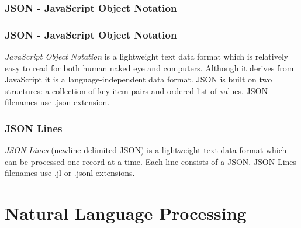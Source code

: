 \begin{frame}[fragile]
    \frametitle{JSON - JavaScript Object Notation}
    \mycode
\end{frame}

\begin{frame}
    \frametitle{JSON - JavaScript Object Notation}
    \begin{definition}
        \emph{JavaScript Object Notation} is a lightweight text data format which is relatively easy to read for both human naked eye and computers. Although it derives from JavaScript it is a language-independent data format. JSON is built on two structures: a collection of key-item pairs and ordered list of values. JSON filenames use .json extension.
    \end{definition}
\end{frame}


\begin{frame}[fragile]
    \frametitle{JSON Lines}
    \mycode
    \begin{definition}
        \emph{JSON Lines} (newline-delimited JSON) is a lightweight text data format which can be processed one record at a time. Each line consists of a JSON. JSON Lines filenames use .jl or .jsonl extensions.
    \end{definition}
\end{frame}

\section[NLP]{Natural Language Processing}

